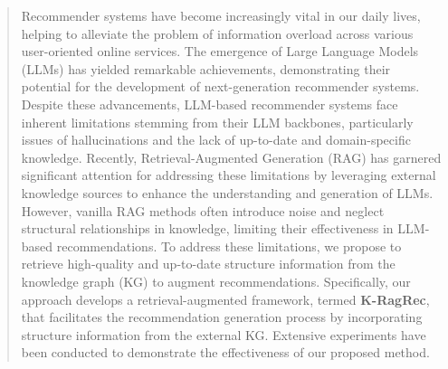 \begin{abstract}
Recommender systems have become increasingly vital in our daily lives, helping to alleviate the problem of information overload across various user-oriented online services. The emergence of Large Language Models (LLMs) has yielded remarkable achievements, demonstrating their potential for the development of next-generation recommender systems. Despite these advancements, LLM-based recommender systems face inherent limitations stemming from their LLM backbones, particularly issues of hallucinations and the lack of up-to-date and domain-specific knowledge.  
Recently, Retrieval-Augmented Generation (RAG) has garnered significant attention for addressing these limitations by leveraging external knowledge sources to enhance the understanding and generation of LLMs. 
However, vanilla RAG methods often introduce noise and neglect structural relationships in knowledge, limiting their effectiveness in LLM-based recommendations.
To address these limitations, we propose to retrieve high-quality and up-to-date structure information from the knowledge graph (KG) to augment recommendations.
Specifically, our approach develops a retrieval-augmented framework, termed \textbf{K-RagRec}, that facilitates the recommendation generation process by incorporating structure information from the external KG. Extensive experiments have been conducted to demonstrate the effectiveness of our proposed method.



\end{abstract}

